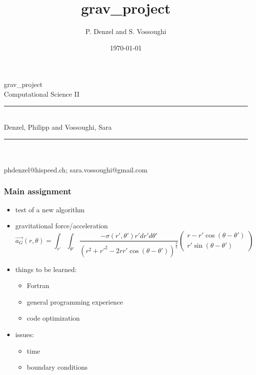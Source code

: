 \documentclass{beamer}
\title{grav\_project}
\author{P. Denzel and S. Vossoughi}
\date{\today}
\begin{document}
\begin{frame}
 \LARGE
 \sf 	   grav\_project \\ 
	   Computational Science II \\

\rule{0.8\textwidth}{0.5pt} \\ %
 \Large Denzel, Philipp and Vossoughi, Sara \\
\rule{0.8\textwidth}{0.5pt} \\  %
   \\ phdenzel@hispeed.ch; sara.vossoughi@gmail.com \\
\end{frame}
\begin{frame}
 \frametitle{Main assignment}
 \begin{itemize}
  \item test of a new algorithm
  \item gravitational force/acceleration
  \begin{equation*}
   \overrightarrow{a_{G}}(r,\theta) = \int_{r'}\int_{\theta'} \frac{-\sigma(r',\theta')r'dr'd\theta'}{(r^{2}+r'^{2}-2rr'\cos{(\theta-\theta')})^{\frac{3}{2}}} \left(
    \begin{array}{c}
      r-r'\cos{(\theta-\theta')} \\
      r'\sin{(\theta-\theta')}
    \end{array}
  \right)
  \end{equation*}
  \item things to be learned:
  \begin{itemize}
   \item Fortran
   \item general programming experience
   \item code optimization
  \end{itemize}
  \item issues:
  \begin{itemize}
   \item time
   \item boundary conditions
  \end{itemize}
 \end{itemize}
\end{frame}
\end{document}
